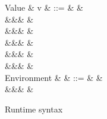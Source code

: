 \begin{figure}
\begin{syntaxfig}
\mbox{Value}
&
v
&
::=
&
\annot{\exTrue}{\alpha} \mid \annot{\exFalse}{\alpha}
&
\\
&&&
&
\\
&&&
&
\\
&&&
&
\\
&&&
\annot{\exNil}{\alpha}
&
\\
&&&
&
\\[2mm]
\mbox{Environment}
&
\rho
&
::=
&
\envEmpty
&
\\
&&&
&
\end{syntaxfig}
\caption{Runtime syntax}
\end{figure}
